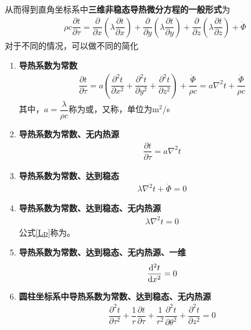从而得到直角坐标系中\textbf{三维非稳态导热微分方程的一般形式}为
\begin{align}
	\rho c \dfrac{\partial t}{\partial \tau} = \dfrac{\partial }{\partial x}\left(\lambda \dfrac{\partial t}{\partial x}\right) + \dfrac{\partial }{\partial y}\left(\lambda \dfrac{\partial t}{\partial y}\right) + \dfrac{\partial }{\partial z}\left(\lambda \dfrac{\partial t}{\partial z}\right) + \dot{\varPhi}
\end{align}
对于不同的情况，可以做不同的简化
\begin{enumerate}
	\item \textbf{导热系数为常数}
	\begin{align}
		\dfrac{\partial t}{\partial \tau} = a \left(\dfrac{\partial^2 t}{\partial x^2} + \dfrac{\partial^2 t}{\partial y^2} + \dfrac{\partial^2 t}{\partial z^2}\right) + \dfrac{\dot{\varPhi}}{\rho c} = a \nabla^2 t + \dfrac{\dot{\varPhi}}{\rho c}
	\end{align}
	其中，$a = \dfrac{\lambda}{\rho c}$称为或，又称，单位为$\text{m}^2$/s
	\vspace*{0.5em}
	
	\item \textbf{导热系数为常数、无内热源}
	\begin{align}
		\dfrac{\partial t}{\partial \tau} = a \nabla^2 t
	\end{align}

	\item \textbf{导热系数为常数、达到稳态}
	\begin{align}
		\lambda \nabla^2 t + \dot{\varPhi} = 0
	\end{align}

	\item \textbf{导热系数为常数、达到稳态、无内热源}
	\begin{align}
		\lambda \nabla^2 t  = 0
		\label{Lp}
	\end{align}
	公式\eqref{Lp}称为。
	
	\item \textbf{导热系数为常数、达到稳态、无内热源、一维}
	\begin{align}
		\dfrac{{\rm{d}}^2 t}{{\rm{d}} x^2} = 0
	\end{align}

	\item \textbf{圆柱坐标系中导热系数为常数、达到稳态、无内热源}
	\begin{align}
		\dfrac{\partial^2 t}{\partial \tau^2} + \dfrac{1}{r} \dfrac{\partial t}{\partial \tau} + \dfrac{1}{r^2} \dfrac{\partial^2 t}{\partial \theta^2} + \dfrac{\partial^2 t}{\partial z^2} = 0 
	\end{align}


\end{enumerate}

